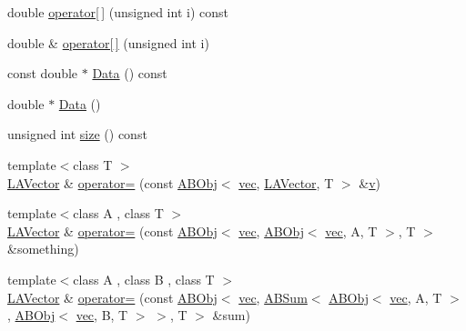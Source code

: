 \begin{DoxyCompactItemize}
\item 
double \mbox{\hyperlink{classROOT_1_1Minuit2_1_1LAVector_a2ce4a54737c9a2b3097adb48bbe2913c}{operator\mbox{[}$\,$\mbox{]}}} (unsigned int i) const
\item 
double \& \mbox{\hyperlink{classROOT_1_1Minuit2_1_1LAVector_aae517a4a6bf31a2869591079b7af4b15}{operator\mbox{[}$\,$\mbox{]}}} (unsigned int i)
\item 
const double $\ast$ \mbox{\hyperlink{classROOT_1_1Minuit2_1_1LAVector_a22e21b176e4d63740045edb4c12fe0a3}{Data}} () const
\item 
double $\ast$ \mbox{\hyperlink{classROOT_1_1Minuit2_1_1LAVector_ad2685b4f4d71a3a68fcf447779dec718}{Data}} ()
\item 
unsigned int \mbox{\hyperlink{classROOT_1_1Minuit2_1_1LAVector_a145e47ac78c4fcace3209ef477255937}{size}} () const
\item 
{\footnotesize template$<$class T $>$ }\\\mbox{\hyperlink{classROOT_1_1Minuit2_1_1LAVector}{L\+A\+Vector}} \& \mbox{\hyperlink{classROOT_1_1Minuit2_1_1LAVector_aac656a7123178e44525885d0d5ab2e86}{operator=}} (const \mbox{\hyperlink{classROOT_1_1Minuit2_1_1ABObj}{A\+B\+Obj}}$<$ \mbox{\hyperlink{classROOT_1_1Minuit2_1_1vec}{vec}}, \mbox{\hyperlink{classROOT_1_1Minuit2_1_1LAVector}{L\+A\+Vector}}, T $>$ \&\mbox{\hyperlink{adat__devel_2lib_2hadron_2hadron__timeslice_8cc_a716fc87f5e814be3ceee2405ed6ff22a}{v}})
\item 
{\footnotesize template$<$class A , class T $>$ }\\\mbox{\hyperlink{classROOT_1_1Minuit2_1_1LAVector}{L\+A\+Vector}} \& \mbox{\hyperlink{classROOT_1_1Minuit2_1_1LAVector_a968511a119769ea707df72b17fc044c9}{operator=}} (const \mbox{\hyperlink{classROOT_1_1Minuit2_1_1ABObj}{A\+B\+Obj}}$<$ \mbox{\hyperlink{classROOT_1_1Minuit2_1_1vec}{vec}}, \mbox{\hyperlink{classROOT_1_1Minuit2_1_1ABObj}{A\+B\+Obj}}$<$ \mbox{\hyperlink{classROOT_1_1Minuit2_1_1vec}{vec}}, A, T $>$, T $>$ \&something)
\item 
{\footnotesize template$<$class A , class B , class T $>$ }\\\mbox{\hyperlink{classROOT_1_1Minuit2_1_1LAVector}{L\+A\+Vector}} \& \mbox{\hyperlink{classROOT_1_1Minuit2_1_1LAVector_a9ecf0f7d6cfc259fe0bb4589a060d7a3}{operator=}} (const \mbox{\hyperlink{classROOT_1_1Minuit2_1_1ABObj}{A\+B\+Obj}}$<$ \mbox{\hyperlink{classROOT_1_1Minuit2_1_1vec}{vec}}, \mbox{\hyperlink{classROOT_1_1Minuit2_1_1ABSum}{A\+B\+Sum}}$<$ \mbox{\hyperlink{classROOT_1_1Minuit2_1_1ABObj}{A\+B\+Obj}}$<$ \mbox{\hyperlink{classROOT_1_1Minuit2_1_1vec}{vec}}, A, T $>$, \mbox{\hyperlink{classROOT_1_1Minuit2_1_1ABObj}{A\+B\+Obj}}$<$ \mbox{\hyperlink{classROOT_1_1Minuit2_1_1vec}{vec}}, B, T $>$ $>$, T $>$ \&sum)

\end{DoxyCompactItemize}
